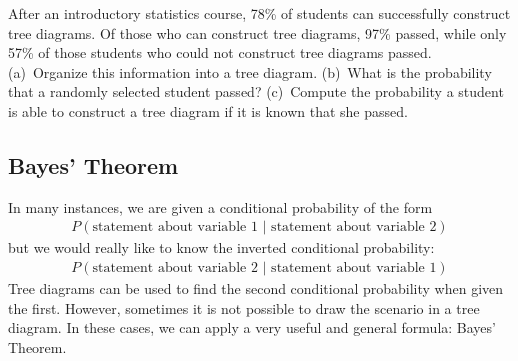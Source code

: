 
\begin{exercisewrap}
\begin{nexercise}
After an introductory statistics course, 78\% of students can successfully construct tree diagrams. Of those who can construct tree diagrams, 97\% passed, while only 57\% of those students who could not construct tree diagrams passed. (a)~Organize this information into a tree diagram. (b)~What is the probability that a randomly selected student passed? (c)~Compute the probability a student is able to construct a tree diagram if it is known that she passed.\footnotemark
\end{nexercise}
\end{exercisewrap}


\subsection{Bayes' Theorem}
\label{bayesTheoremSubsection}


In many instances, we are given a conditional probability of the form
\begin{align*}
P(\text{statement about variable 1 } | \text{ statement about variable 2})
\end{align*}
but we would really like to know the inverted conditional probability:
\begin{align*}
P(\text{statement about variable 2 } | \text{ statement about variable 1})
\end{align*}
Tree diagrams can be used to find the second conditional probability when given the first. However, sometimes it is not possible to draw the scenario in a tree diagram. In these cases, we can apply a very useful and general formula: Bayes' Theorem.

